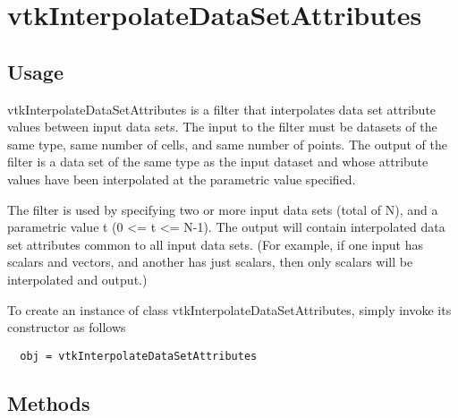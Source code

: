 \section{vtkInterpolateDataSetAttributes}

\subsection{Usage}

 vtkInterpolateDataSetAttributes is a filter that interpolates data set
 attribute values between input data sets. The input to the filter
 must be datasets of the same type, same number of cells, and same 
 number of points. The output of the filter is a data set of the same
 type as the input dataset and whose attribute values have been 
 interpolated at the parametric value specified.

 The filter is used by specifying two or more input data sets (total of N),
 and a parametric value t (0 <= t <= N-1). The output will contain
 interpolated data set attributes common to all input data sets. (For
 example, if one input has scalars and vectors, and another has just
 scalars, then only scalars will be interpolated and output.)

To create an instance of class vtkInterpolateDataSetAttributes, simply
invoke its constructor as follows
\begin{verbatim}
  obj = vtkInterpolateDataSetAttributes
\end{verbatim}
\subsection{Methods}


